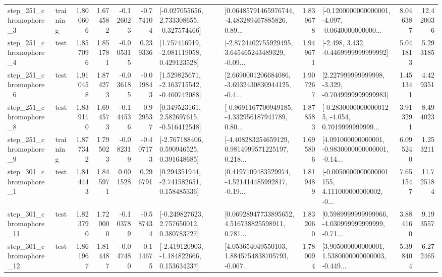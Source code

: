 \begin{tabular}{llrrrrllrlrr}
   step\_251\_chromophore\_3 &  training &      1.800606 &    1.674582 &     -0.126023 & -0.774104 &   [-0.027055656, 2.733308655, -0.327574466] &  [0.06485791465976744, -4.483289467885826, 0.89... &       1.839678 &  [-0.1200000000000001, -4.097, -0.0640000000000... &            8.046387 &         12.420036 \\
   step\_251\_chromophore\_4 &      test &      1.857096 &    1.851781 &     -0.005315 &  0.239336 &    [1.757416919, -2.081119058, 0.429123528] &  [-2.8724402755929495, 3.645465243489329, -0.09... &       1.949671 &               [-2.498, 3.432, -0.4469999999999992] &            5.041813 &          5.293185 \\
   step\_251\_chromophore\_6 &      test &      1.910458 &    1.874273 &     -0.036185 & -0.019843 &   [1.529825671, -2.163715542, -0.460742088] &  [2.6690001206684086, -3.6932430830944125, -0.4... &       1.907267 &   [2.227999999999998, -3.329, -0.7049999999999983] &            1.451341 &          4.429351 \\
   step\_251\_chromophore\_8 &      test &      1.839110 &    1.694573 &     -0.144536 & -0.929537 &    [0.349523161, 2.582697615, -0.516412548] &  [-0.9691167700949185, -4.332956187941789, 0.80... &       1.878583 &  [-0.28300000000000125, -4.054, 0.7019999999999... &            3.913291 &          8.494023 \\
   step\_251\_chromophore\_9 &  training &      1.877342 &    1.795023 &     -0.082319 & -0.407173 &    [-2.767188406, 0.590946525, 0.391648685] &  [-4.408283254659129, 0.9814999571225197, 0.218... &       1.695806 &  [4.091000000000001, -0.9830000000000001, -0.14... &            6.095240 &          1.253211 \\
   step\_301\_chromophore\_1 &      test &      1.844443 &    1.845971 &      0.001528 &  0.296791 &    [0.294351944, -2.741582651, 0.158485336] &  [0.4197109483529974, -4.521414485992817, -0.19... &       1.819489 &  [-0.0050000000000001155, 4.111000000000002, -0... &            7.651547 &         11.725184 \\
  step\_301\_chromophore\_11 &      test &      1.823790 &    1.720000 &     -0.103789 & -0.587434 &    [-0.249827623, 2.757650012, 0.380783727] &  [0.06928947733895652, 4.516738825598911, 0.781... &       1.832060 &  [0.5989999999999966, -4.030999999999999, -0.71... &            3.884160 &          9.193557 \\
  step\_301\_chromophore\_12 &      test &      1.861967 &    1.814487 &     -0.047480 & -0.114675 &   [-2.419120903, -1.184822666, 0.153634237] &  [4.053654049550103, 1.8845754838705793, -0.067... &       1.780094 &  [3.905000000000001, 1.5380000000000003, -0.449... &            5.398404 &          6.272465 \\

\end{tabular}
